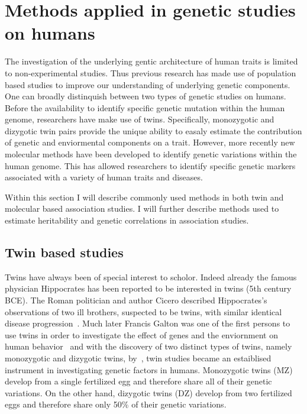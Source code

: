 \section{Methods applied in genetic studies on humans}
\label{sec:methods_applied_in_genetic_studies_on_humans}

The investigation of the underlying gentic architecture of human traits is limited to non-experimental studies.
Thus previous research has made use of population based studies to improve our understanding of underlying genetic components.
One can broadly distinquish between two types of genetic studies on humans.
Before the availability to identify specific genetic mutation within the human genome, researchers have make use of twins.
Specifically, monozygotic and dizygotic twin pairs provide the unique ability to easaly estimate the contribution of genetic and enviormental components on a trait.
However, more recently new molecular methods have been developed to identify genetic variations within the human genome.
This has allowed researchers to identify specific genetic markers associated with a variety of human traits and diseases.

Within this section I will describe commonly used methods in both twin and molecular based association studies.
I will further describe methods used to estimate heritability and genetic correlations in association studies.

\subsection{Twin based studies}
\label{sub:twin_based_studies}

Twins have always been of special interest to scholor.
Indeed already the famous physician Hippocrates has been reported to be interested in twins (5th century BCE).
The Roman politician and author Cicero described Hippocrates's observations of two ill brothers, suspected to be twins, with similar identical disease progression~\cite{Cicero44BC}.
Much later Francis Galton was one of the first persons to use twins in order to investigate the effect of genes and the enviornment on human behavior~\cite{Rende1990} and with the discovery of two distinct types of twins, namely monozygotic and dizygotic twins, by~\citet{Simens1924}, twin studies became an estaiblised instrument in investigating genetic factors in humans.
Monozygotic twins (MZ) develop from a single fertilized egg and therefore share all of their genetic variations.
On the other hand, dizygotic twins (DZ) develop from two fertilized eggs and therefore share only 50\% of their genetic variations.

